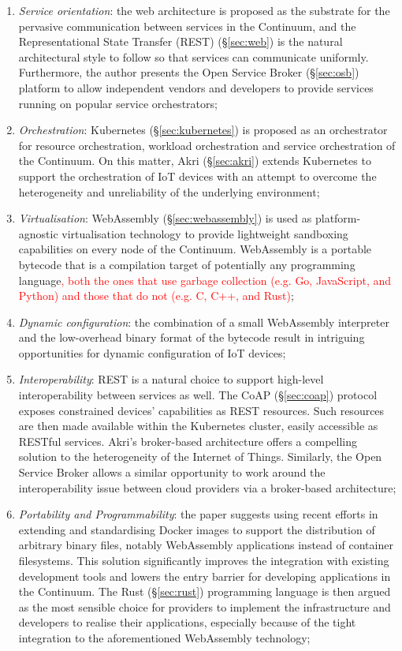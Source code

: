 \begin{enumerate}
    \item \emph{Service orientation}: the web architecture is proposed as the substrate for the pervasive communication between services in the Continuum, and the Representational State Transfer (REST) (§\ref{sec:web}) is the natural architectural style to follow so that services can communicate uniformly. Furthermore, the author presents the Open Service Broker (§\ref{sec:osb}) platform to allow independent vendors and developers to provide services running on popular service orchestrators;
    \item \emph{Orchestration}: Kubernetes (§\ref{sec:kubernetes}) is proposed as an orchestrator for resource orchestration, workload orchestration and service orchestration of the Continuum. On this matter, Akri (§\ref{sec:akri}) extends Kubernetes to support the orchestration of IoT devices with an attempt to overcome the heterogeneity and unreliability of the underlying environment;
    \item \emph{Virtualisation}: WebAssembly (§\ref{sec:webassembly}) is used as platform-agnostic virtualisation technology to provide lightweight sandboxing capabilities on every node of the Continuum. WebAssembly is a portable bytecode that is a compilation target of potentially any programming language\textcolor{red}{, both the ones that use garbage collection (e.g. Go, JavaScript, and Python) and those that do not (e.g. C, C++, and Rust)};
    \item \emph{Dynamic configuration}: the combination of a small WebAssembly interpreter and the low-overhead binary format of the bytecode result in intriguing opportunities for dynamic configuration of IoT devices;
    \item \emph{Interoperability}: REST is a natural choice to support high-level interoperability between services as well. The CoAP (§\ref{sec:coap}) protocol exposes constrained devices' capabilities as REST resources. Such resources are then made available within the Kubernetes cluster, easily accessible as RESTful services. Akri's broker-based architecture offers a compelling solution to the heterogeneity of the Internet of Things. Similarly, the Open Service Broker allows a similar opportunity to work around the interoperability issue between cloud providers via a broker-based architecture;
    \item \emph{Portability and Programmability}: the paper suggests using recent efforts in extending and standardising Docker images to support the distribution of arbitrary binary files, notably WebAssembly applications instead of container filesystems. This solution significantly improves the integration with existing development tools and lowers the entry barrier for developing applications in the Continuum. The Rust (§\ref{sec:rust}) programming language is then argued as the most sensible choice for providers to implement the infrastructure and developers to realise their applications, especially because of the tight integration to the aforementioned WebAssembly technology;
\end{enumerate}

